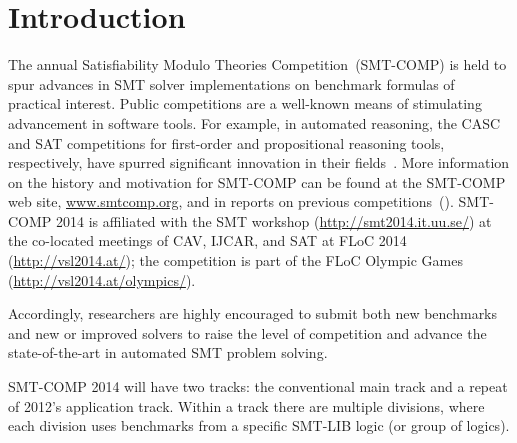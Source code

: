 \documentclass[12pt]{article}
\begin{document}
\section{Introduction}
\label{sec:intro}

The annual Satisfiability Modulo Theories Competition~(SMT-COMP) is
held to spur advances in SMT solver implementations on benchmark
formulas of practical interest.  Public competitions are a well-known
means of stimulating advancement in software tools.  For example, in
automated reasoning, the CASC and SAT competitions for first-order and
propositional reasoning tools, respectively, have spurred significant
innovation in their fields~\cite{PSS02,leberre+03}.  More information
on the history and motivation for SMT-COMP can be found at the
SMT-COMP web site, \url{www.smtcomp.org}, and in reports on previous
competitions~(\cite{SMTCOMP-2008,BDOS08,SMTCOMP-FMSD,SMTCOMP-JAR,SMTCOMP2012,SMTEVAL2013}).
SMT-COMP 2014 is affiliated with the SMT workshop (\url {http://smt2014.it.uu.se/}) at the co-located meetings of CAV, IJCAR, and SAT at FLoC 2014 (\url{http://vsl2014.at/}); the competition is part of the
FLoC Olympic Games (\url{http://vsl2014.at/olympics/}).

Accordingly, researchers are highly encouraged to submit both new benchmarks
and new or improved solvers to raise the level of competition and advance
the state-of-the-art in automated SMT problem solving.

SMT-COMP 2014 will have two tracks: the conventional main track and a repeat of 2012's application track.
Within a track there are multiple divisions, where each division
uses benchmarks from a specific SMT-LIB logic (or group of logics).
\end{document}
